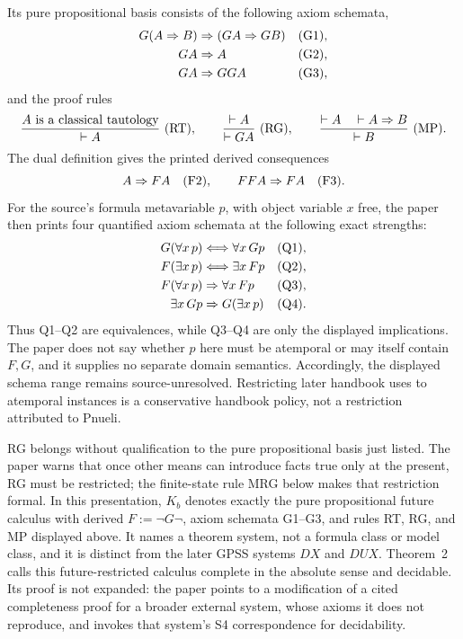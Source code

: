 Its pure propositional basis consists of the following axiom schemata,
\[
\begin{aligned}
 G(A\Rightarrow B)&\Rightarrow(GA\Rightarrow GB) &&({\rm G1}),\\
 GA&\Rightarrow A &&({\rm G2}),\\
 GA&\Rightarrow GGA &&({\rm G3}),
\end{aligned}
\]
and the proof rules
\[
 \frac{A\text{ is a classical tautology}}{\vdash A}\ ({\rm RT}),
 \qquad
 \frac{\vdash A}{\vdash GA}\ ({\rm RG}),
 \qquad
 \frac{\vdash A\quad\vdash A\Rightarrow B}{\vdash B}\ ({\rm MP}).
\]
The dual definition gives the printed derived consequences
\[
 A\Rightarrow FA\quad({\rm F2}),
 \qquad
 FFA\Rightarrow FA\quad({\rm F3}).
\]
For the source's formula metavariable \(p\), with object variable \(x\) free,
the paper then prints four quantified axiom schemata at the following exact
strengths:
\[
\begin{aligned}
 G(\forall x\,p)&\Longleftrightarrow\forall x\,Gp &&({\rm Q1}),\\
 F(\exists x\,p)&\Longleftrightarrow\exists x\,Fp &&({\rm Q2}),\\
 F(\forall x\,p)&\Rightarrow\forall x\,Fp &&({\rm Q3}),\\
 \exists x\,Gp&\Rightarrow G(\exists x\,p) &&({\rm Q4}).
\end{aligned}
\]
Thus Q1--Q2 are equivalences, while Q3--Q4 are only the displayed
implications.  The paper does not say whether \(p\) here must be atemporal or
may itself contain \(F,G\), and it supplies no separate domain semantics.
Accordingly, the displayed schema range remains source-unresolved.  Restricting
later handbook uses to atemporal instances is a conservative handbook policy,
not a restriction attributed to Pnueli.

RG belongs without qualification to the pure propositional basis just listed.
The paper warns that once other means can introduce facts true only at the
present, RG must be restricted; the finite-state rule MRG below makes that
restriction formal.  In this presentation, \(K_b\) denotes exactly the pure
propositional future calculus with derived \(F:=\neg G\neg\), axiom schemata
G1--G3, and rules RT, RG, and MP displayed above.  It names a theorem system,
not a formula class or model class, and it is distinct from the later GPSS
systems \(DX\) and \(DUX\).  Theorem~2 calls this future-restricted calculus
complete in the absolute sense and decidable.  Its proof is not expanded: the
paper points to a modification of a cited completeness proof for a broader
external system, whose axioms it does not reproduce, and invokes that system's
S4 correspondence for decidability.

